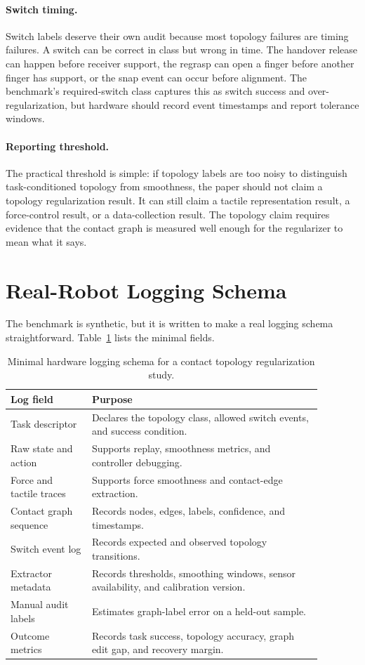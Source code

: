 \documentclass{article}
\begin{document}
\paragraph{Switch timing.}
Switch labels deserve their own audit because most topology failures are timing failures. A switch can be correct in class but wrong in time. The handover release can happen before receiver support, the regrasp can open a finger before another finger has support, or the snap event can occur before alignment. The benchmark's required-switch class captures this as switch success and over-regularization, but hardware should record event timestamps and report tolerance windows.

\paragraph{Reporting threshold.}
The practical threshold is simple: if topology labels are too noisy to distinguish task-conditioned topology from smoothness, the paper should not claim a topology regularization result. It can still claim a tactile representation result, a force-control result, or a data-collection result. The topology claim requires evidence that the contact graph is measured well enough for the regularizer to mean what it says.

\section{Real-Robot Logging Schema}

The benchmark is synthetic, but it is written to make a real logging schema straightforward. Table~\ref{tab:logging} lists the minimal fields.

\begin{table}[H]
\centering
\small
\begin{tabular}{p{0.23\linewidth}p{0.65\linewidth}}
\toprule
Log field & Purpose \\
\midrule
Task descriptor & Declares the topology class, allowed switch events, and success condition. \\
Raw state and action & Supports replay, smoothness metrics, and controller debugging. \\
Force and tactile traces & Supports force smoothness and contact-edge extraction. \\
Contact graph sequence & Records nodes, edges, labels, confidence, and timestamps. \\
Switch event log & Records expected and observed topology transitions. \\
Extractor metadata & Records thresholds, smoothing windows, sensor availability, and calibration version. \\
Manual audit labels & Estimates graph-label error on a held-out sample. \\
Outcome metrics & Records task success, topology accuracy, graph edit gap, and recovery margin. \\
\bottomrule
\end{tabular}
\caption{Minimal hardware logging schema for a contact topology regularization study.}
\label{tab:logging}
\end{table}
\end{document}
